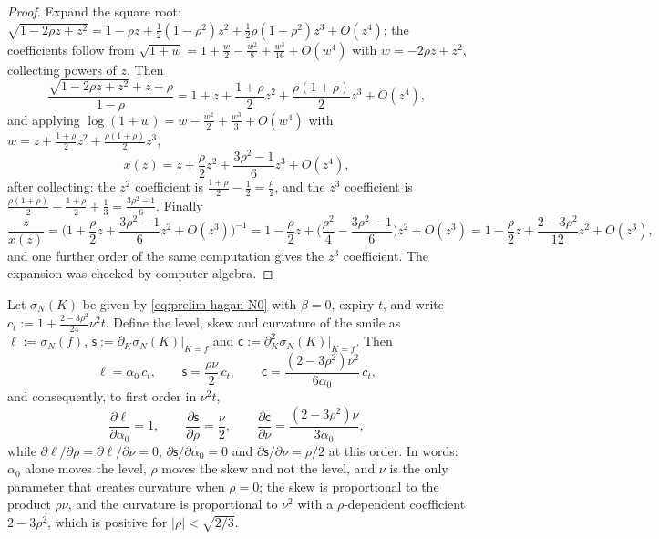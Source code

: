 \documentclass[../../../main.tex]{subfiles}
\begin{document}
\begin{proof}
Expand the square root: $\sqrt{1-2\rho z+z^2}=1-\rho z+\tfrac12(1-\rho^2)z^2+\tfrac12\rho(1-\rho^2)z^3+O(z^4)$; the coefficients follow from $\sqrt{1+w}=1+\tfrac w2-\tfrac{w^2}8+\tfrac{w^3}{16}+O(w^4)$ with $w=-2\rho z+z^2$, collecting powers of $z$. Then
\[
\frac{\sqrt{1-2\rho z+z^2}+z-\rho}{1-\rho}=1+z+\frac{1+\rho}2z^2+\frac{\rho(1+\rho)}2z^3+O(z^4),
\]
and applying $\log(1+w)=w-\tfrac{w^2}2+\tfrac{w^3}3+O(w^4)$ with $w=z+\tfrac{1+\rho}2z^2+\tfrac{\rho(1+\rho)}2z^3$,
\[
x(z)=z+\frac\rho2z^2+\frac{3\rho^2-1}{6}z^3+O(z^4),
\]
after collecting: the $z^2$ coefficient is $\tfrac{1+\rho}2-\tfrac12=\tfrac\rho2$, and the $z^3$ coefficient is $\tfrac{\rho(1+\rho)}2-\tfrac{1+\rho}2+\tfrac13=\tfrac{3\rho^2-1}6$. Finally
\[
\frac{z}{x(z)}=\Big(1+\frac\rho2z+\frac{3\rho^2-1}6z^2+O(z^3)\Big)^{-1}=1-\frac\rho2z+\Big(\frac{\rho^2}4-\frac{3\rho^2-1}{6}\Big)z^2+O(z^3)=1-\frac\rho2z+\frac{2-3\rho^2}{12}z^2+O(z^3),
\]
and one further order of the same computation gives the $z^3$ coefficient. The expansion was checked by computer algebra.
\end{proof}

\begin{proposition}\label{prop:prelim-lsc}
Let $\sigma_N(K)$ be given by \eqref{eq:prelim-hagan-N0} with $\beta=0$, expiry $t$, and write $c_t:=1+\frac{2-3\rho^2}{24}\nu^2t$. Define the level, skew and curvature of the smile as $\ell:=\sigma_N(f)$, $\mathsf s:=\partial_K\sigma_N(K)|_{K=f}$ and $\mathsf c:=\partial^2_K\sigma_N(K)|_{K=f}$. Then
\begin{equation}\label{eq:prelim-lsc}
\ell=\alpha_0\,c_t,\qquad \mathsf s=\frac{\rho\nu}{2}\,c_t,\qquad \mathsf c=\frac{(2-3\rho^2)\nu^2}{6\alpha_0}\,c_t,
\end{equation}
and consequently, to first order in $\nu^2t$,
\[
\frac{\partial\ell}{\partial\alpha_0}=1,\qquad \frac{\partial\mathsf s}{\partial\rho}=\frac\nu2,\qquad \frac{\partial\mathsf c}{\partial\nu}=\frac{(2-3\rho^2)\nu}{3\alpha_0},
\]
while $\partial\ell/\partial\rho=\partial\ell/\partial\nu=0$, $\partial\mathsf s/\partial\alpha_0=0$ and $\partial\mathsf s/\partial\nu=\rho/2$ at this order. In words: $\alpha_0$ alone moves the level, $\rho$ moves the skew and not the level, and $\nu$ is the only parameter that creates curvature when $\rho=0$; the skew is proportional to the product $\rho\nu$, and the curvature is proportional to $\nu^2$ with a $\rho$-dependent coefficient $2-3\rho^2$, which is positive for $|\rho|<\sqrt{2/3}$.
\end{proposition}
\end{document}
